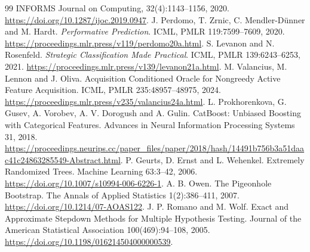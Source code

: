 \documentclass[11pt]{article}
\begin{document}
\begin{thebibliography}{99}
INFORMS Journal on Computing, 32(4):1143--1156, 2020.
\url{https://doi.org/10.1287/ijoc.2019.0947}.
 J. Perdomo, T. Zrnic, C. Mendler-D\"unner and M. Hardt.
\emph{Performative Prediction}. ICML, PMLR 119:7599--7609, 2020.
\url{https://proceedings.mlr.press/v119/perdomo20a.html}.
 S. Levanon and N. Rosenfeld.
\emph{Strategic Classification Made Practical}. ICML, PMLR 139:6243--6253, 2021.
\url{https://proceedings.mlr.press/v139/levanon21a.html}.
 M. Valancius, M. Lennon and J. Oliva.
Acquisition Conditioned Oracle for Nongreedy Active Feature Acquisition.
ICML, PMLR 235:48957--48975, 2024.
\url{https://proceedings.mlr.press/v235/valancius24a.html}.
 L. Prokhorenkova, G. Gusev, A. Vorobev, A. V. Dorogush and A. Gulin.
CatBoost: Unbiased Boosting with Categorical Features.
Advances in Neural Information Processing Systems 31, 2018.
\url{https://proceedings.neurips.cc/paper_files/paper/2018/hash/14491b756b3a51daac41c24863285549-Abstract.html}.
 P. Geurts, D. Ernst and L. Wehenkel.
Extremely Randomized Trees. Machine Learning 63:3--42, 2006.
\url{https://doi.org/10.1007/s10994-006-6226-1}.
 A. B. Owen. The Pigeonhole Bootstrap.
The Annals of Applied Statistics 1(2):386--411, 2007.
\url{https://doi.org/10.1214/07-AOAS122}.
 J. P. Romano and M. Wolf. Exact and Approximate Stepdown
Methods for Multiple Hypothesis Testing. Journal of the American Statistical
Association 100(469):94--108, 2005.
\url{https://doi.org/10.1198/016214504000000539}.
\end{thebibliography}
\end{document}
